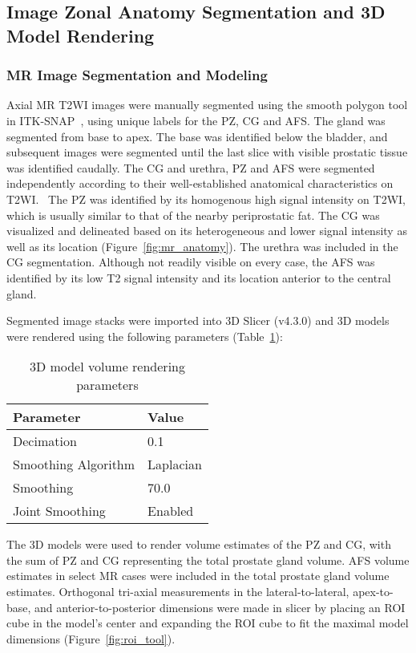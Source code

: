 \subsection{Image Zonal Anatomy Segmentation and 3D Model Rendering}
\subsubsection{MR Image Segmentation and Modeling}
Axial MR T2WI images were manually segmented using the smooth polygon tool in
ITK-SNAP~\cite{Yushkevich2006}, using unique labels for the PZ, CG and AFS. The
gland was segmented from base to apex.  The base was identified below the
bladder, and subsequent images were segmented until the last slice with visible
prostatic tissue was identified caudally. The CG and urethra, PZ and AFS were
segmented independently according to their well-established anatomical
characteristics on
T2WI.~\cite{Barentsz2012,Jung2012,Poon1985,Hricak2007,Bonekamp2011} The PZ was
identified by its homogenous high signal intensity on T2WI, which is usually
similar to that of the nearby periprostatic fat. The CG was visualized and
delineated based on its heterogeneous and lower signal intensity as well as its
location (Figure~\ref{fig:mr_anatomy}). The urethra was included in the CG
segmentation. Although not readily visible on every case, the AFS was
identified by its low T2 signal intensity and its location anterior to the
central gland. 

Segmented image stacks were imported into 3D Slicer (v4.3.0) and 3D
models were rendered using the following parameters (Table~\ref{tab:3dslicer}):

\begin{table}[h!]
\centering
\caption{3D model volume rendering parameters}
\begin{tabular}{ll}
{\bf Parameter} & {\bf Value} \\ \hline
Decimation & 0.1 \\
Smoothing Algorithm & Laplacian \\
Smoothing  & 70.0 \\
Joint Smoothing & Enabled \\
\end{tabular}
\label{tab:3dslicer}
\end{table}

The 3D models were used to render volume estimates of the PZ and CG, with the
sum of PZ and CG representing the total prostate gland volume. AFS volume
estimates in select MR cases were included in the total prostate gland volume
estimates. Orthogonal tri-axial measurements in the lateral-to-lateral,
apex-to-base, and anterior-to-posterior dimensions were made in slicer by
placing an ROI cube in the model's center and expanding the ROI cube to fit the
maximal model dimensions (Figure~\ref{fig:roi_tool}). 

